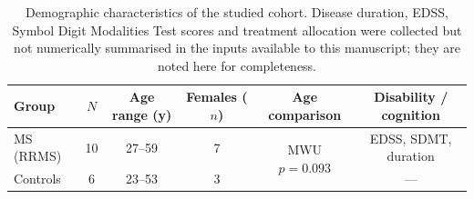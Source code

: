 \documentclass[11pt]{article}
\begin{document}
\begin{table}[htbp]
\centering
\caption{Demographic characteristics of the studied cohort. Disease duration, EDSS, Symbol Digit Modalities Test scores and treatment allocation were collected but not numerically summarised in the inputs available to this manuscript; they are noted here for completeness.}
\label{tab:cohort}
\begin{tabular}{lccccc}
\toprule
Group & $N$ & Age range (y) & Females ($n$) & Age comparison & Disability / cognition \\
\midrule
MS (RRMS) & 10 & 27--59 & 7 & \multirow{2}{*}{MWU $p=0.093$} & EDSS, SDMT, duration \\
Controls  &  6 & 23--53 & 3 &                                 & --- \\
\bottomrule
\end{tabular}
\end{table}
\end{document}
